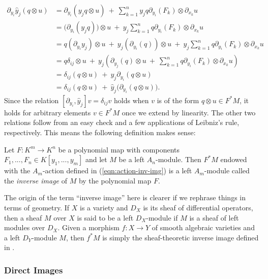 \begin{align*}
	\partial_{y_i}\hat{y}_j(q\otimes u)
	  &= \partial_{y_i}(y_j q \otimes u) ~+~ \sum_{k=1}^n y_jq\partial_{y_i}(F_k) \otimes \partial_{x_k}u \\
	  &= \big(\partial_{y_i}(y_j q)\big)\otimes u ~+~ y_j \sum_{k=1}^n q \partial_{y_i}(F_k) \otimes \partial_{x_k}u \\
	  &= q(\partial_{y_i}y_j)\otimes u ~+~ y_j(\partial_{y_i}(q))\otimes u ~+~ y_j \sum_{k=1}^n q \partial_{y_i}(F_k) \otimes \partial_{x_k}u \\
	  &= q\delta_{ij} \otimes u ~+~ y_j\left(\partial_{y_j}(q) \otimes u ~+~ \sum_{k=1}^n q\partial_{y_i}(F_k) \otimes \partial_{x_k}u\right) \\
	  &= \delta_{ij}(q\otimes u) ~+~ y_j\partial_{y_i}(q\otimes u) \\
	  &= \delta_{ij}(q\otimes u) ~+~ \hat{y}_j\big(\partial_{y_i}(q\otimes u)\big).
\end{align*}
Since the relation $[\partial_{y_i},\hat{y}_j]v = \delta_{ij}v$ holds when $v$ is of the form $q\otimes u \in F^*M$, it holds for arbitrary elements $v\in F^*M$ once we extend by linearity. The other two relations follow from an easy check and a few applications of Leibniz's rule, respectively.  This means the following definition makes sense:

\begin{defn}\label{defn:inv-img}
	Let $F:K^m\to K^n$ be a polynomial map with components $F_1,...,F_n \in K[y_1,...,y_m]$ and let $M$ be a left $A_n$-module. Then $F^*M$ endowed with the $A_m$-action defined in (\ref{eqn:action-inv-img}) is a left $A_m$-module called the \emph{inverse image} of $M$ by the polynomial map $F$.
\end{defn}

\begin{rmk}\label{rmk:inv-img}
	The origin of the term ``inverse image'' here is clearer if we rephrase things in terms of geometry. If $X$ is a variety and $D_X$ is its sheaf of differential operators, then a sheaf $M$ over $X$ is said to be a left $D_X$-module if $M$ is a sheaf of left modules over $D_X$. Given a morphism $f:X\to Y$ of smooth algebraic varieties and a left $D_Y$-module $M$, then $f^*M$ is simply the sheaf-theoretic inverse image defined in \cite{hartshorne}.
\end{rmk}

\subsubsection{Direct Images}

\newpage
\printbibliography

